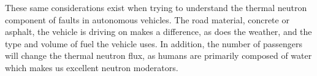 






These same considerations exist when trying to understand the thermal neutron component of faults in autonomous vehicles. The road material, concrete or asphalt, the vehicle is driving on makes a difference, as does the weather, and the type and volume of fuel the vehicle uses. In addition, the number of passengers will change the thermal neutron flux, as humans are primarily composed of water  which makes us excellent neutron moderators. 

